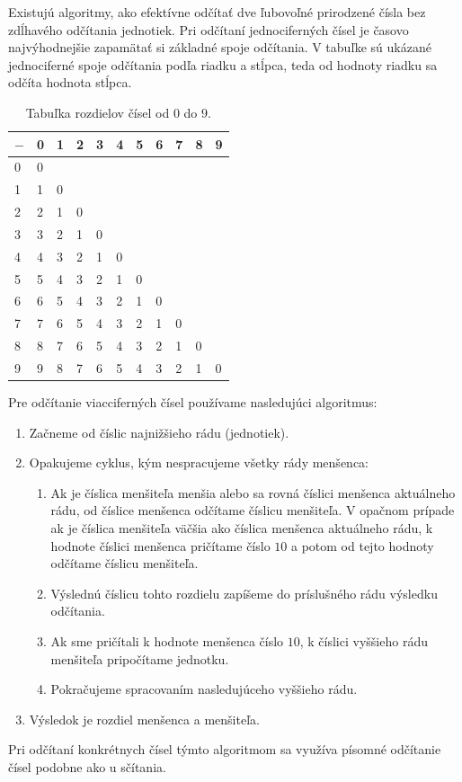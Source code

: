 \documentclass{article}
\begin{document}
Existujú algoritmy, ako efektívne odčítať dve ľubovoľné prirodzené čísla bez zdĺhavého odčítania jednotiek. Pri odčítaní jednociferných čísel je časovo najvýhodnejšie zapamätať si základné spoje odčítania. V tabuľke sú ukázané jednociferné spoje odčítania podľa riadku a stĺpca, teda od hodnoty riadku sa odčíta hodnota stĺpca.
\begin{table}[H]
  \centering
  \renewcommand{\arraystretch}{1.3}
  \begin{tabular}{C|CCCCCCCCCC}
    \(-\) & 0 & 1 & 2 & 3 & 4 & 5 & 6 & 7 & 8 & 9 \\
     & 0 &   &   &   &   &   &   &   &   &   \\
    1 & 1 & 0 &   &   &   &   &   &   &   &   \\
    2 & 2 & 1 & 0 &   &   &   &   &   &   &   \\
    3 & 3 & 2 & 1 & 0 &   &   &   &   &   &   \\
    4 & 4 & 3 & 2 & 1 & 0 &   &   &   &   &   \\
    5 & 5 & 4 & 3 & 2 & 1 & 0 &   &   &   &   \\
    6 & 6 & 5 & 4 & 3 & 2 & 1 & 0 &   &   &   \\
    7 & 7 & 6 & 5 & 4 & 3 & 2 & 1 & 0 &   &   \\
    8 & 8 & 7 & 6 & 5 & 4 & 3 & 2 & 1 & 0 &   \\
    9 & 9 & 8 & 7 & 6 & 5 & 4 & 3 & 2 & 1 & 0 \\
  \end{tabular}
  \caption{Tabuľka rozdielov čísel od \(0\) do \(9\).}
\end{table}

Pre odčítanie viacciferných čísel používame nasledujúci algoritmus:
\begin{enumerate}[label=\arabic*)]
  \item Začneme od číslic najnižšieho rádu (jednotiek).
  \item Opakujeme cyklus, kým nespracujeme všetky rády menšenca:
  \begin{enumerate}
    \item Ak je číslica menšiteľa menšia alebo sa rovná číslici menšenca aktuálneho rádu, od číslice menšenca odčítame číslicu menšiteľa. V opačnom prípade ak je číslica menšiteľa väčšia ako číslica menšenca aktuálneho rádu, k hodnote číslici menšenca pričítame číslo \(10\) a potom od tejto hodnoty odčítame číslicu menšiteľa.
    \item Výslednú číslicu tohto rozdielu zapíšeme do príslušného rádu výsledku odčítania.
    \item Ak sme pričítali k hodnote menšenca číslo \(10\), k číslici vyššieho rádu menšiteľa pripočítame jednotku.
    \item Pokračujeme spracovaním nasledujúceho vyššieho rádu.
  \end{enumerate}
  \item Výsledok je rozdiel menšenca a menšiteľa.
\end{enumerate}
Pri odčítaní konkrétnych čísel týmto algoritmom sa využíva písomné odčítanie čísel podobne ako u sčítania.
\end{document}
